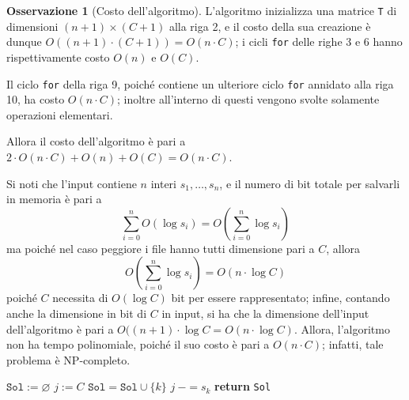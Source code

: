 \documentclass[14pt]{extreport}
\theoremstyle{definition}
\theoremstyle{definition}
\newtheorem{remark}{Osservazione}[subsection]
\begin{document}
\begin{remark}[Costo dell'algoritmo]
    L'algoritmo inizializza una matrice \texttt{T} di dimensioni $(n + 1) \times (C + 1)$ alla riga 2, e il costo della sua creazione è dunque $O((n + 1) \cdot (C + 1)) = O(n \cdot C)$; i cicli \texttt{for} delle righe 3 e 6 hanno rispettivamente costo $O(n)$ e $O(C)$.

    Il ciclo \texttt{for} della riga 9, poiché contiene un ulteriore ciclo \texttt{for} annidato alla riga 10, ha costo $O(n \cdot C)$; inoltre all'interno di questi vengono svolte solamente operazioni elementari.

    Allora il costo dell'algoritmo è pari a $2 \cdot O(n \cdot C) + O(n) + O(C) = O(n \cdot C)$.

    Si noti che l'input contiene $n$ interi $s_1, \ldots, s_n$, e il numero di bit totale per salvarli in memoria è pari a $$\displaystyle \sum_{i = 0}^n{O(\log s_i)} = O \left ( \sum_{i = 0}^n{\log s_i} \right )$$ ma poiché nel caso peggiore i file hanno tutti dimensione pari a $C$, allora $$O \left ( \sum_{i = 0}^n{\log s_i} \right ) = O(n \cdot \log C)$$ poiché $C$ necessita di $O(\log C)$ bit per essere rappresentato; infine, contando anche la dimensione in bit di $C$ in input, si ha che la dimensione dell'input dell'algoritmo è pari a $O((n + 1) \cdot \log C = O(n \cdot \log C)$. Allora, l'algoritmo non ha tempo polinomiale, poiché il suo costo è pari a $O(n \cdot C)$; infatti, tale problema è NP-completo.
\end{remark}

\begin{algorithm}[H]
    \caption{
        Data una lista \texttt{S} di dimensioni di $n$ file, una memoria di capacità $C$, e la matrice costruita attraverso la funzione \texttt{fileAllocation} dell'\cref{fileallocation}, l'algoritmo restituisce un insieme di file che massimizza la memoria allocata; inoltre, i file hanno tutti dimensione inferiore a $C$.\\
        \textbf{Input}: \texttt{S} lista di dimensioni di file; $C$ capacità della memoria, tale che $\forall s_i \in \texttt{S} \quad s_i \le C$; \texttt{T} matrice prodotta precedentemente.\\
        \textbf{Output}: un insieme di file che massimizza la memoria allocata.
    }

    \begin{algorithmic}[1]
        \label{fileallocation2}
            \State $\texttt{Sol} := \varnothing$
            \State $j:= C$
             
                    \State $\texttt{Sol} = \texttt{Sol} \cup \{k\}$
                    \State $j \ -= s_k$
                \EndIf
            \EndFor
            \State \textbf{return} \texttt{Sol}
        \EndFunction
    \end{algorithmic}
\end{algorithm}
\end{document}
